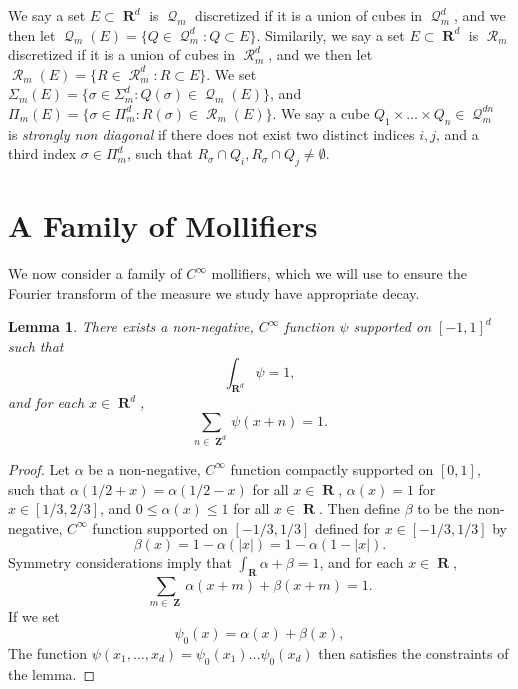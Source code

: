 \documentclass[12pt,reqno]{article}
\numberwithin{equation}{section}
\DeclareMathOperator{\RR}{\mathbf{R}}
\DeclareMathOperator{\ZZ}{\mathbf{Z}}
\newtheorem{lemma}[theorem]{Lemma}
\DeclareMathOperator{\DQ}{\mathcal{Q}}
\DeclareMathOperator{\DR}{\mathcal{R}}
\begin{document}
We say a set $E \subset \RR^d$ is $\DQ_m$ discretized if it is a union of cubes in $\DQ_m^d$, and we then let $\DQ_m(E) = \{ Q \in \DQ_m^d : Q \subset E \}$. Similarily, we say a set $E \subset \RR^d$ is $\DR_m$ discretized if it is a union of cubes in $\DR_m^d$, and we then let $\DR_m(E) = \{ R \in \DR_m^d : R \subset E \}$. We set $\Sigma_m(E) = \{ \sigma \in \Sigma_m^d : Q(\sigma) \in \DQ_m(E) \}$, and $\Pi_m(E) = \{ \sigma \in \Pi_m^d : R(\sigma) \in \DR_m(E) \}$. We say a cube $Q_1 \times \dots \times Q_n \in \DQ_m^{dn}$ is \emph{strongly non diagonal} if there does not exist two distinct indices $i,j$, and a third index $\sigma \in \Pi_m^d$, such that $R_\sigma \cap Q_i, R_\sigma \cap Q_j \neq \emptyset$.

\section{A Family of Mollifiers}

We now consider a family of $C^\infty$ mollifiers, which we will use to ensure the Fourier transform of the measure we study have appropriate decay.

\begin{lemma} \label{lemma19020941290}
    There exists a non-negative, $C^\infty$ function $\psi$ supported on $[-1,1]^d$ such that
    \begin{equation} \label{equation1249015901590190}
        \int_{\RR^d} \psi = 1,
    \end{equation}
    and for each $x \in \RR^d$,
    \begin{equation} \label{equation50914902149012}
        \sum_{n \in \ZZ^d} \psi(x + n) = 1.
    \end{equation}
\end{lemma}
\begin{proof}
    Let $\alpha$ be a non-negative, $C^\infty$ function compactly supported on $[0,1]$, such that $\alpha(1/2 + x) = \alpha(1/2 - x)$ for all $x \in \RR$, $\alpha(x) = 1$ for $x \in [1/3,2/3]$, and $0 \leq \alpha(x) \leq 1$ for all $x \in \RR$. Then define $\beta$ to be the non-negative, $C^\infty$ function supported on $[-1/3,1/3]$ defined for $x \in [-1/3,1/3]$ by
    \[ \beta(x) = 1 - \alpha(|x|) = 1 - \alpha(1 - |x|). \]
    Symmetry considerations imply that $\int_{\RR} \alpha + \beta = 1$, and for each $x \in \RR$,
    \begin{equation} \label{equation129410294910}
        \sum_{m \in \ZZ} \alpha(x + m) + \beta(x + m) = 1.
    \end{equation}
    If we set
    \[ \psi_0(x) = \alpha(x) + \beta(x), \]
    The function $\psi(x_1, \dots, x_d) = \psi_0(x_1) \dots \psi_0(x_d)$ then satisfies the constraints of the lemma.
\end{proof}
\end{document}
